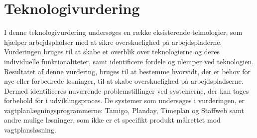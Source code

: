 


\section{Teknologivurdering} \label{NuvaerendeLosning}
I denne teknologivurdering undersøges en række eksisterende teknologier, som  hjælper arbejdspladser med at sikre overskuelighed på arbejdspladerne. Vurderingen bruges til at skabe et overblik over teknologierne og deres individuelle funktionaliteter, samt identificere fordele og ulemper ved teknologien. Resultatet af denne vurdering, bruges til at bestemme hvorvidt, der er behov for nye eller forbedrede løsninger, til at skabe overskuelighed på arbejdspladserne. Dermed identificeres nuværende problemstillinger ved systemerne, der kan tages forbehold for i udviklingsproces. De systemer som undersøges i vurderingen, er vagtplanlægningsprogrammerne: Tamigo, Planday, Timeplan og Staffweb samt andre mulige løsninger, som ikke er et specifikt produkt målrettet mod vagtplansløsning.

